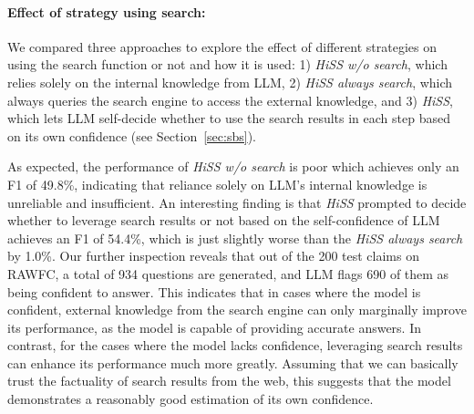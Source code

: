 \documentclass[11pt]{article}
\begin{document}
\paragraph{Effect of strategy using search:}
We compared three approaches to explore the effect of different strategies on using the search function or not and how it is used: 1) \textit{HiSS w/o search}, which relies solely on the internal knowledge from LLM, 2) \textit{HiSS always search}, which always queries the search engine to access the external knowledge, and 3) \textit{HiSS}, which lets LLM self-decide whether to use the search results in each step based on its own confidence (see Section~\ref{sec:sbs}).

As expected, the performance of \textit{HiSS w/o search} is poor which achieves only an F1 of 49.8\%, indicating that reliance solely on LLM's internal knowledge is unreliable and insufficient. An interesting finding is that \textit{HiSS} prompted to decide whether to leverage search results or not based on the self-confidence of LLM achieves an F1 of 54.4\%, which is just slightly worse than the \textit{HiSS always search} by 1.0\%. Our further inspection reveals that out of the 200 test claims on RAWFC, a total of 934 questions are generated, and LLM flags 690 of them as being confident to answer.
This indicates that in cases where the model is confident, external knowledge from the search engine can only marginally improve its performance, as the model is capable of providing accurate answers. In contrast, for the cases where the model lacks confidence, leveraging search results can enhance its performance much more greatly.  Assuming that we can basically trust the factuality of search results from the web, this suggests that the model demonstrates a reasonably good estimation of its own confidence.
\end{document}
